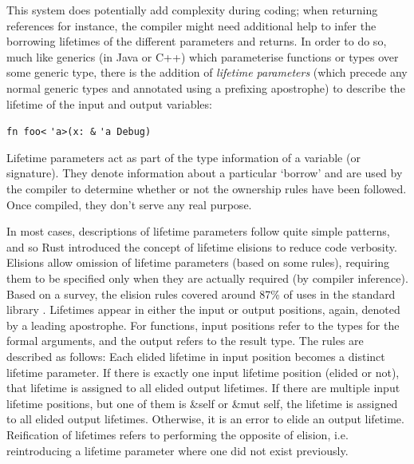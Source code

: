 This system does potentially add complexity during coding; when returning references for instance, the compiler might need additional help to infer the borrowing lifetimes of the different parameters and returns. In order to do so, much like generics (in Java or C++) which parameterise functions or types over some generic type, there is the addition of \textit{lifetime parameters} (which precede any normal generic types and annotated using a prefixing apostrophe) to describe the lifetime of the input and output variables:

{\verb|fn foo<|}{\color{blue} \verb|'a|}{\verb|>(x: &|}
{\color{blue} \verb|'a|}{\verb| Debug)|}

Lifetime parameters act as part of the type information of a variable (or signature). They denote information about a particular `borrow' and are used by the compiler to determine whether or not the ownership rules have been followed. Once compiled, they don't serve any real purpose.

In most cases, descriptions of lifetime parameters follow quite simple patterns, and so Rust introduced the concept of lifetime elisions to reduce code verbosity. Elisions allow omission of lifetime parameters (based on some rules), requiring them to be specified only when they are actually required (by compiler inference). Based on a survey, the elision rules covered around 87\% of uses in the standard library \cite{elisionrules}. Lifetimes appear in either the input or output positions, again, denoted by a leading apostrophe. For functions, input positions refer to the types for the formal arguments, and the output refers to the result type. The rules are described as follows: Each elided lifetime in input position becomes a distinct lifetime parameter. If there is exactly one input lifetime position (elided or not), that lifetime is assigned to all elided output lifetimes. If there are multiple input lifetime positions, but one of them is \&self or \&mut self, the lifetime is assigned to all elided output lifetimes. Otherwise, it is an error to elide an output lifetime.  Reification of lifetimes refers to performing the opposite of elision, i.e. reintroducing a lifetime parameter where one did not exist previously.


